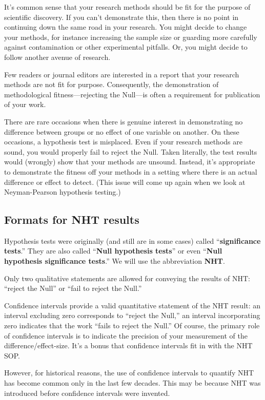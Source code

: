 \documentclass[
  letterpaper,
  DIV=11,
  numbers=noendperiod,
  oneside]{scrartcl}
\begin{document}
It's common sense that your research methods should be fit for the
purpose of scientific discovery. If you can't demonstrate this, then
there is no point in continuing down the same road in your research. You
might decide to change your methods, for instance increasing the sample
size or guarding more carefully against contamination or other
experimental pitfalls. Or, you might decide to follow another avenue of
research.

Few readers or journal editors are interested in a report that your
research methods are not fit for purpose. Consequently, the
demonstration of methodological fitness---rejecting the Null---is often
a requirement for publication of your work.

There are rare occasions when there is genuine interest in demonstrating
no difference between groups or no effect of one variable on another. On
these occasions, a hypothesis test is misplaced. Even if your research
methods are sound, you would properly fail to reject the Null. Taken
literally, the test results would (wrongly) show that your methods are
unsound. Instead, it's appropriate to demonstrate the fitness off your
methods in a setting where there is an actual difference or effect to
detect. (This issue will come up again when we look at Neyman-Pearson
hypothesis testing.)

\subsection{Formats for NHT results}\label{formats-for-nht-results}

Hypothesis tests were originally (and still are in some cases) called
``\textbf{significance tests}.'' They are also called ``\textbf{Null
hypothesis tests}'' or even ``\textbf{Null hypothesis significance
tests}.'' We will use the abbreviation \textbf{NHT}.

Only two qualitative statements are allowed for conveying the results of
NHT: ``reject the Null'' or ``fail to reject the Null.''

Confidence intervals provide a valid quantitative statement of the NHT
result: an interval excluding zero corresponds to ``reject the Null,''
an interval incorporating zero indicates that the work ``fails to reject
the Null.'' Of course, the primary role of confidence intervals is to
indicate the precision of your measurement of the
difference/effect-size. It's a bonus that confidence intervals fit in
with the NHT SOP.

However, for historical reasons, the use of confidence intervals to
quantify NHT has become common only in the last few decades. This may be
because NHT was introduced before confidence intervals were invented.
\end{document}
